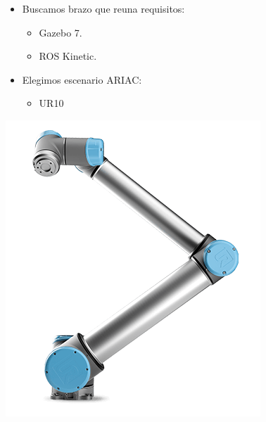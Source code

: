 \documentclass[notes,slidesec,a4]{seminar}
\begin{document}
\begin{hslide}
	\begin{minipage}{0.6\textwidth}
		\begin{itemize}
			\item Buscamos brazo que reuna requisitos:
			\begin{itemize}
				\item Gazebo 7.
				\item ROS Kinetic.
			\end{itemize}
			\item Elegimos escenario ARIAC:
			\begin{itemize}
				\item UR10
			\end{itemize}
		\end{itemize}
	\end{minipage}
	\begin{minipage}{0.4\textwidth}
		\includegraphics[width=\textwidth]{ur10.png}
	\end{minipage}
\end{hslide}
\end{document}

